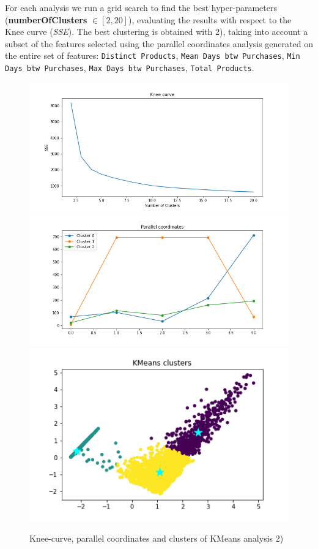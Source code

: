 \documentclass[12pt]{article}
\begin{document}
For each analysis we run a grid search to find the best hyper-parameters (\textbf{numberOfClusters} $\in [2, 20]$), evaluating the results with respect to the Knee curve (\textit{SSE}). 
The best clustering is obtained with 2), taking into account a subset of the features selected using the parallel coordinates analysis generated on the entire set of features: \texttt{Distinct Products}, \texttt{Mean Days btw Purchases}, \texttt{Min Days btw Purchases}, \texttt{Max Days btw Purchases}, \texttt{Total Products}.

\begin{figure}[!h]
  \includegraphics[scale=0.25]{images/kmeans-knee-2.png}
\endminipage\hfill
{}
  \includegraphics[scale=0.25]{images/kmeans-parcoord-2.png}
\endminipage\hfill
{}
    \includegraphics[scale=0.35]{images/kmeans-clusters-2.png}
    \endminipage\hfill
\caption{Knee-curve, parallel coordinates and clusters of KMeans analysis 2) }
\label{fig:kmeans_graphs}
\end{figure}
\end{document}
